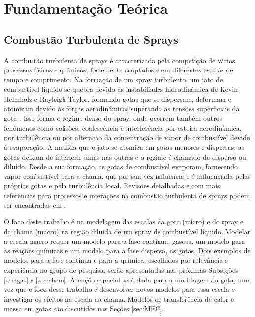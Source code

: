 

\section{Fundamentação Teórica}



\subsection{Combustão Turbulenta de Sprays} \label{sec:teoria}

A combustão turbulenta de sprays é caracterizada pela competição de vários processos físicos e químicos, fortemente acoplados e em diferentes escalas de tempo e comprimento. 
Na formação de um spray turbulento, um jato de combustível líquido se quebra devido às instabiliades hidrodinâmica de Kevin-Helmholz e Rayleigh-Taylor, formando gotas que se dispersam, deformam e atomizam devido às forças aerodinâmicas superando as tensões superficiais da gota \cite{JennyB2012}.
Isso forma o {regime denso} do spray, onde ocorrem também outros fenômenos como colisões, coalescência e interferência por esteira aerodinâmica, por turbulência ou por alteração da concentração de vapor de combustível devido à evaporação.
A medida que o jato se atomiza em gotas menores e dispersas, as gotas deixam de interferir umas nas outras e o regime é chamado de disperso ou diluído. 
Desde a sua formação, as gotas de combustível evaporam, fornecendo vapor combustível para a chama, que por sua vez influencia e é influenciada pelas próprias gotas e pela turbulência local.
Revisões detalhadas e com mais referências para processos e interações na combustão turbulenta de sprays podem ser encontradas em \cite{JennyB2012, MasriA2016, SanchezA2015, ZhouL2021} .

O foco deste trabalho é na modelagem das escalas da gota (micro) e do spray e da chama (macro) na região diluida de um spray de combustível líquido.
Modelar a escala macro requer um modelo para a fase contínua, gasosa, um modelo para as reações químicas e um modelo para a fase dispersa, as gotas.
Dois exemplos de modelos para a fase contínua e para a química, escolhidos por relevância e experiência no grupo de pesquisa, serão apresentadas nas próximas Subseções \ref{sec:gas} e \ref{sec:chem}.
Atenção especial será dada para a modelagem da gota, uma vez que o foco desse trabalho é desenvolver novos modelos para essa escala e investigar os efeitos na escala da chama.
Modelos de transferência de calor e massa em gotas são discutidos nas Seções \ref{sec:MEC}. 

